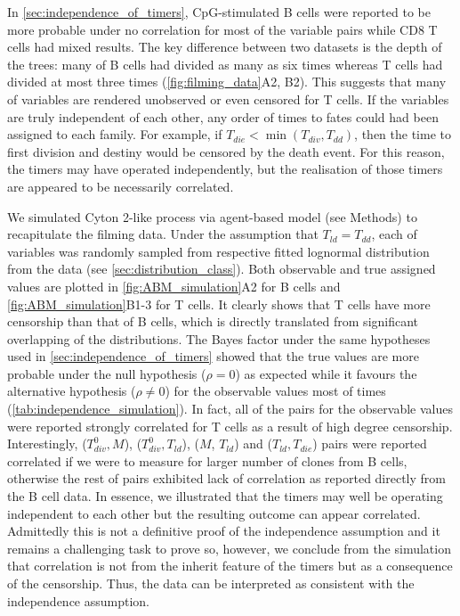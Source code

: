 \documentclass[11pt, a4paper]{article}
\begin{document}
\linenumbers
\noindent
In \cref{sec:independence_of_timers}, CpG-stimulated B cells were reported to be more probable under no correlation for most of the variable pairs while CD8 T cells had mixed results. The key difference between two datasets is the depth of the trees: many of B cells had divided as many as six times whereas T cells had divided at most three times (\cref{fig:filming_data}A2, B2). This suggests that many of variables are rendered unobserved or even censored for T cells. If the variables are truly independent of each other, any order of times to fates could had been assigned to each family. For example, if $T_{die} < \min(T_{div}, T_{dd})$, then the time to first division and destiny would be censored by the death event. For this reason, the timers may have operated independently, but the realisation of those timers are appeared to be necessarily correlated. 

We simulated Cyton 2-like process via agent-based model (see Methods) to recapitulate the filming data. Under the assumption that $T_{ld} = T_{dd}$, each of variables was randomly sampled from respective fitted lognormal distribution from the data (see \cref{sec:distribution_class}). Both observable and true assigned values are plotted in \cref{fig:ABM_simulation}A2 for B cells and \cref{fig:ABM_simulation}B1-3 for T cells. It clearly shows that T cells have more censorship than that of B cells, which is directly translated from significant overlapping of the distributions. The Bayes factor under the same hypotheses used in \cref{sec:independence_of_timers} showed that the true values are more probable under the null hypothesis ($\rho=0$) as expected while it favours the alternative hypothesis ($\rho \neq 0$) for the observable values most of times (\cref{tab:independence_simulation}). In fact, all of the pairs for the observable values were reported strongly correlated for T cells as a result of high degree censorship. Interestingly, ($T_{div}^0, M$), ($T_{div}^0, T_{ld}$), ($M$, $T_{ld}$) and ($T_{ld}, T_{die}$) pairs were reported correlated if we were to measure for larger number of clones from B cells, otherwise the rest of pairs exhibited lack of correlation as reported directly from the B cell data. In essence, we illustrated that the timers may well be operating independent to each other but the resulting outcome can appear correlated. Admittedly this is not a definitive proof of the independence assumption and it remains a challenging task to prove so, however, we conclude from the simulation that correlation is not from the inherit feature of the timers but as a consequence of the censorship. Thus, the data can be interpreted as consistent with the independence assumption.
\end{document}
